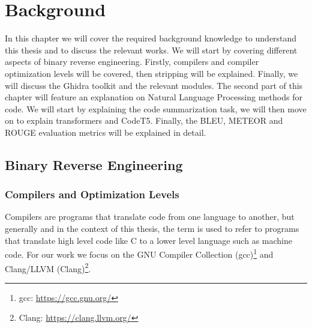 \chapter{Background}
\label{background}



In this chapter we will cover the required background knowledge to understand this thesis and to discuss the relevant works. We will start by covering different aspects of binary reverse engineering. Firstly, compilers and compiler optimization levels will be covered, then stripping will be explained. Finally, we will discuss the Ghidra toolkit and the relevant modules. The second part of this chapter will feature an explanation on Natural Language Processing methods for code. We will start by explaining the code summarization task, we will then move on to explain transformers and CodeT5. Finally, the BLEU, METEOR and ROUGE evaluation metrics will be explained in detail.
\section{Binary Reverse Engineering}

\subsection{Compilers and Optimization Levels}
Compilers are programs that translate code from one language to another, but generally and in the context of this thesis, the term is used to refer to programs that translate high level code like C to a lower level language such as machine code. For our work we focus on the GNU Compiler Collection (gcc)\footnote{gcc: \url{https://gcc.gnu.org/}} and Clang/LLVM (Clang)\footnote{Clang: \url{https://clang.llvm.org/}}.

